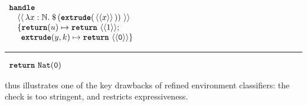 \begin{code}
  \begin{efflst}
    $\begin{array}{l}
      \textbf{\texttt{handle}} \\
      \quad \equote[\, {\lambda x:\mathbb{N}.\; \splice[\, {(\textbf{\texttt{extrude}}(\, \equote[x] \, ))}\, ]} \, ]  \\
      \quad \{ \textbf{\texttt{return}}(u) \mapsto \return{\equote[{1}]}; \\
      \quad \; \, \textbf{\texttt{extrude}}(y, k) \mapsto { \return{\equote[\texttt{0}]}} \}\\
    \end{array}$

    \vspace{2mm} 
\textcolor{effComment}{\hrule height 0.2mm \relax}
\vspace{2mm} 

\textcolor{effComment}{$\begin{array}{l}\return{\texttt{Nat}(\texttt{0})}\end{array}$}

\end{efflst}
%
\label{listing:efflang-no-scope-extrusion}
\end{code}

 thus illustrates one of the key drawbacks of refined environment classifiers: the check is too stringent, and restricts expressiveness. 